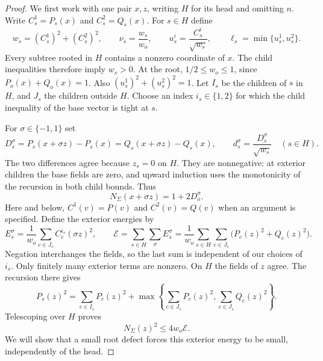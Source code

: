 \begin{proof}
We first work with one pair $x,z$, writing $H$ for its head and omitting
$n$.  Write $C_s^1=P_s(x)$ and $C_s^2=Q_s(x)$.  For $s\in H$ define
\begin{equation}\label{stop:normalization}
 w_s=(C_s^1)^2+(C_s^2)^2,\qquad
 \nu_s=\frac{w_s}{w_o},\qquad
 u_s^i=\frac{C_s^i}{\sqrt{w_s}},\qquad
 \ell_s=\min\{u_s^1,u_s^2\}.
\end{equation}
Every subtree rooted in $H$ contains a nonzero coordinate of $x$.
The child inequalities therefore imply $w_s>0$.  At the root,
$1/2\le w_o\le1$, since $P_o(x)+Q_o(x)=1$.
Also $(u_s^1)^2+(u_s^2)^2=1$.  Let $I_s$ be the children of $s$ in
$H$, and $J_s$ the children outside $H$.  Choose an index $i_s\in\{1,2\}$
for which the child inequality of the base vector is tight at $s$.

For $\sigma\in\{-1,1\}$ set
\begin{equation}\label{stop:defects}
 D_s^\sigma=P_s(x+\sigma z)-P_s(x)
             =Q_s(x+\sigma z)-Q_s(x),\qquad
 d_s^\sigma=\frac{D_s^\sigma}{\sqrt{w_s}}\quad(s\in H).
\end{equation}
The two differences agree because $z_s=0$ on $H$.  They are nonnegative:
at exterior children the base fields are zero, and upward induction
uses the monotonicity of the recursion in both child bounds.  Thus
\begin{equation}\label{stop:root-defect}
 N_\Sigma(x+\sigma z)=1+2D_o^\sigma.
\end{equation}
Here and below, $C^1(v)=P(v)$ and $C^2(v)=Q(v)$ when an argument is
specified.  Define the exterior energies by
\begin{equation}\label{stop:exterior}
 E_s^\sigma=\frac1{w_o}\sum_{c\in J_s}C_c^{i_s}(\sigma z)^2,
 \qquad
 \mathcal E=\sum_{s\in H}\sum_\sigma E_s^\sigma
 =\frac1{w_o}\sum_{s\in H}\sum_{c\in J_s}
       \bigl(P_c(z)^2+Q_c(z)^2\bigr).
\end{equation}
Negation interchanges the fields, so the last sum is independent of
our choices of $i_s$.  Only finitely many exterior terms are nonzero.
On $H$ the fields of $z$ agree.  The recursion there gives
\[
 P_s(z)^2=\sum_{c\in I_s}P_c(z)^2+
 \max\left\{\sum_{c\in J_s}P_c(z)^2,
             \sum_{c\in J_s}Q_c(z)^2\right\}.
\]
Telescoping over $H$ proves
\begin{equation}\label{stop:tail-energy}
 N_\Sigma(z)^2\le4w_o\mathcal E.
\end{equation}
We will show that a small root defect forces this exterior energy to
be small, independently of the head.


\end{proof}
